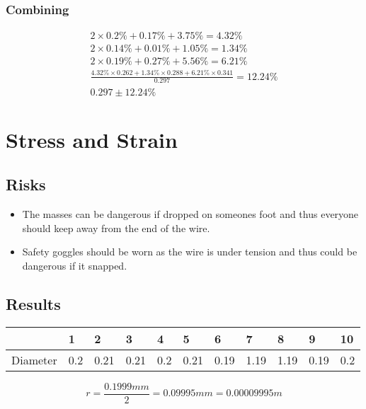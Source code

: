 \documentclass{article}
\begin{document}
\subsubsection*{Combining}

\begin{gather}
	2 \times 0.2\% + 0.17\% + 3.75\% = 4.32\% \\
	2 \times 0.14\% + 0.01\% + 1.05\% = 1.34\% \\
	2 \times 0.19\% + 0.27\% + 5.56\% = 6.21\% \\
	\frac{4.32\% \times 0.262 + 1.34\% \times 0.288 + 6.21\% \times 0.341}{0.297} = 12.24\% \\
	0.297 \pm 12.24\%
\end{gather}

\break

\section{Stress and Strain}

\subsection{Risks}

\begin{itemize}
	\item The masses can be dangerous if dropped on someones foot and thus
		everyone should keep away from the end of the wire.

	\item Safety goggles should be worn as the wire is under tension and
		thus could be dangerous if it snapped.
\end{itemize}

\subsection{Results}

\begin{center}
    \begin{tabular}{l|l|l|l|l|l|l|l|l|l|l}
     & 1 & 2 & 3 & 4 & 5 & 6 & 7 & 8 & 9 & 10\\ \hline
     Diameter & 0.2 & 0.21 & 0.21 & 0.2 & 0.21 & 0.19 & 1.19 & 1.19 & 0.19 & 0.2
    \end{tabular}
\end{center}

\begin{equation}
	r = \frac{0.1999\si{mm}}{2} = 0.09995\si{mm} = 0.00009995 \si{m}
\end{equation}
\end{document}
